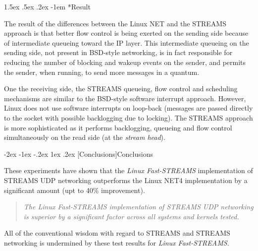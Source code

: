 \documentclass[letterpaper,final,notitlepage,twocolumn,10pt,twoside]{article}
\makeatletter
\renewcommand\section{\@startsection {section}{1}{\z@}%
                                   {-2ex \@plus -1ex \@minus -.2ex}%
                                   {1ex \@plus .2ex}%
                                   {\normalfont\large\bfseries}}
\renewcommand\paragraph{\@startsection{paragraph}{4}{\z@}%
                                    {1.5ex \@plus .5ex \@minus .2ex}%
                                    {-1em}%
                                    {\normalfont\normalsize\bfseries\slshape}}
\makeatother
\begin{document}
\paragraph*{Result}

The result of the differences between the Linux NET and the STREAMS approach
is that better flow control is being exerted on the sending side because of
intermediate queueing toward the IP layer.  This intermediate queueing on the
sending side, not present in BSD-style networking, is in fact responsible for
reducing the number of blocking and wakeup events on the sender, and permits
the sender, when running, to send more messages in a quantum.

One the receiving side, the STREAMS queueing, flow control and scheduling
mechanisms are similar to the BSD-style software interrupt approach.  However,
Linux does not use software interrupts on loop-back (messages are passed
directly to the socket with possible backlogging due to locking).  The STREAMS
approach is more sophisticated as it performs backlogging, queueing and flow
control simultaneously on the read side (at the \textit{stream head}).


\section[Conclusions]{Conclusions}

These experiments have shown that the \textsl{Linux Fast-STREAMS}
implementation of STREAMS UDP networking outperforms the Linux NET4
implementation by a significant amount (upt to 40\% improvement).

\begin{quote}
\textit{The \textsl{Linux Fast-STREAMS} implementation of STREAMS UDP
networking is superior by a significant factor across all systems and kernels
tested.}
\end{quote}

All of the conventional wisdom with regard to STREAMS and STREAMS networking
is undermined by these test results for \textsl{Linux Fast-STREAMS}.
\end{document}
